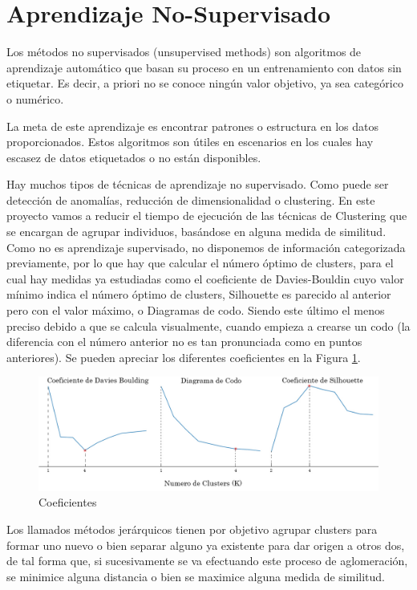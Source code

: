 	
		\newpage

\section{Aprendizaje No-Supervisado}

	Los métodos no supervisados (unsupervised methods) son algoritmos de aprendizaje automático que basan su proceso en un entrenamiento con datos sin etiquetar. Es decir, a priori no se conoce ningún valor objetivo, ya sea categórico o numérico. 
	
	La meta de este aprendizaje es encontrar patrones o estructura en los datos proporcionados. Estos algoritmos son útiles en escenarios en los cuales hay escasez de datos etiquetados o no están disponibles.
	
	Hay muchos tipos de técnicas de aprendizaje no supervisado. Como puede ser detección de anomalías, reducción de dimensionalidad o clustering. En este proyecto vamos a reducir el tiempo de ejecución de las técnicas de Clustering que se encargan de agrupar individuos, basándose en alguna medida de similitud. Como no es aprendizaje supervisado, no disponemos de información categorizada previamente, por lo que hay que calcular el número óptimo de clusters, para el cual hay medidas ya estudiadas como el coeficiente de Davies-Bouldin cuyo valor mínimo indica el número óptimo de clusters, Silhouette es parecido al anterior pero con el valor máximo, o Diagramas de codo. Siendo este último el menos preciso debido a que se calcula visualmente, cuando empieza a crearse un codo (la diferencia con el número anterior no es tan pronunciada como en puntos anteriores). Se pueden apreciar los diferentes coeficientes en la Figura \ref{fig:coeficientes}. 


	\begin{figure}[!h]
		\centering
		\includegraphics[width=1\textwidth]{images/chapter_2/ap_nosup_diagramas}
		\caption{Coeficientes}
		\label{fig:coeficientes}
	\end{figure}


	Los llamados métodos jerárquicos \cite{ackermann2014analysis} tienen por objetivo agrupar clusters para formar uno nuevo o bien separar alguno ya existente para dar origen a otros dos, de tal forma que, si sucesivamente se va efectuando este proceso de aglomeración, se minimice alguna distancia o bien se maximice alguna medida de similitud.

